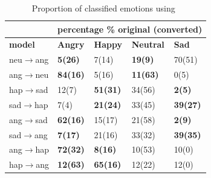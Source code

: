 \documentclass{article}
\begin{document}
\begin{table}[htb]
\centering
\caption{Proportion of classified emotions using~\cite{mirsamadi2017automatic}}
\begin{tabular}{|l|l|l|l|l|}
\hline
& \multicolumn{4}{c|}{\textbf{percentage \% original (converted)}} \\ \hline
\textbf{model}   & \textbf{Angry}      & \textbf{Happy}    & \textbf{Neutral}  & \textbf{Sad}   \\ \hline\hline
neu$\rightarrow$ang       & \textbf{5(26)}     & 7(14)   & \textbf{19(9)}  & 70(51)   \\ \hline
ang$\rightarrow$neu       & \textbf{84(16)}    & 5(16)   & \textbf{11(63)} & 0(5)     \\ \hline
\hline
hap$\rightarrow$sad       & 12(7)     & \textbf{51(31)}  & 34(56) & \textbf{2(5)}     \\ \hline
sad$\rightarrow$hap       & 7(4)      & \textbf{21(24)}  & 33(45) & \textbf{39(27)}   \\ \hline
\hline
ang$\rightarrow$sad       & \textbf{62(16)}    & 15(17)  & 21(58)  & \textbf{2(9)}   \\ \hline
sad$\rightarrow$ang       & \textbf{7(17)}    & 21(16)  & 33(32)  & \textbf{39(35)}   \\ \hline
\hline
ang$\rightarrow$hap       & \textbf{72(32)}      & \textbf{8(16)}   & 10(53)    & 10(0)   \\ \hline
hap$\rightarrow$ang       & \textbf{12(63)}      & \textbf{65(16)}    & 12(22)    & 12(0)   \\ \hline
\end{tabular}%
\label{tab:emo}
\end{table}
\end{document}

